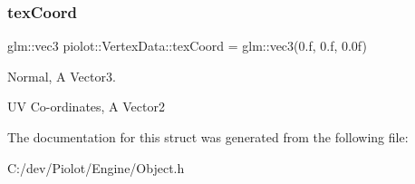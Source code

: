 \subsubsection{\texorpdfstring{tex\+Coord}{texCoord}}
{\footnotesize\ttfamily glm\+::vec3 piolot\+::\+Vertex\+Data\+::tex\+Coord = glm\+::vec3(0.f, 0.f, 0.\+0f)}



Normal, A Vector3. 

UV Co-\/ordinates, A Vector2 

The documentation for this struct was generated from the following file\+:\begin{DoxyCompactItemize}
\item 
C\+:/dev/\+Piolot/\+Engine/Object.\+h\end{DoxyCompactItemize}
